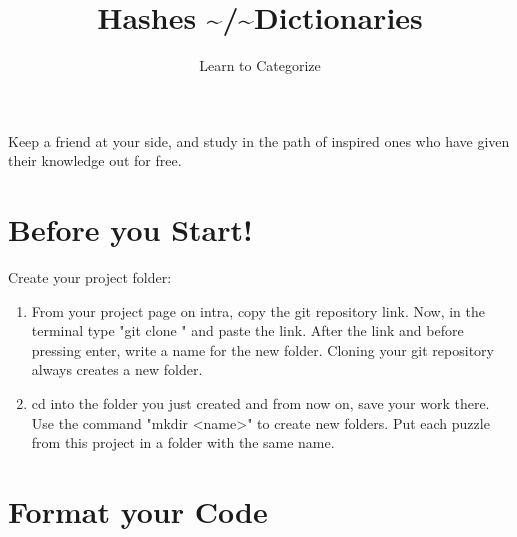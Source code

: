 \documentclass{42-en}
\begin{document}
\title{Hashes \textasciitilde/\textasciitilde Dictionaries}
\subtitle{Learn to Categorize}


\summary
{
	Keep a friend at your side, and study in the path of inspired ones who have given their knowledge out for free. 
}

\maketitle

\tableofcontents


\chapter{Before you Start!}

Create your project folder:
	\begin{enumerate}
		\item From your project page on intra, copy the git repository link. Now, in the terminal type "git clone " and paste the link. After the link and before pressing enter, write a name for the new folder. Cloning your git repository always creates a new folder.
		\item cd into the folder you just created and from now on, save your work there. Use the command "mkdir <name>" to create new folders. Put each puzzle from this project in a folder with the same name.
	\end{enumerate}



\chapter{Format your Code}
\end{document}
